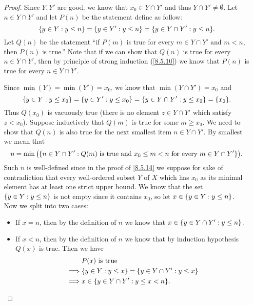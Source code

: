 \begin{proof}
  Since \(Y, Y'\) are good, we know that \(x_0 \in Y \cap Y'\) and thus \(Y \cap Y' \neq \emptyset\).
  Let \(n \in Y \cap Y'\) and let \(P(n)\) be the statement define as follow:
  \[
    \set{y \in Y : y \leq n} = \set{y \in Y' : y \leq n} = \set{y \in Y \cap Y' : y \leq n}.
  \]
  Let \(Q(n)\) be the statement ``if \(P(m)\) is true for every \(m \in Y \cap Y'\) and \(m < n\), then \(P(n)\) is true.''
  Note that if we can show that \(Q(n)\) is true for every \(n \in Y \cap Y'\), then by principle of strong induction (\cref{8.5.10}) we know that \(P(n)\) is true for every \(n \in Y \cap Y'\).

  Since \(\min(Y) = \min(Y') = x_0\), we know that \(\min(Y \cap Y') = x_0\) and
  \[
    \set{y \in Y : y \leq x_0} = \set{y \in Y' : y \leq x_0} = \set{y \in Y \cap Y' : y \leq x_0} = \set{x_0}.
  \]
  Thus \(Q(x_0)\) is vacuously true (there is no element \(z \in Y \cap Y'\) which satisfy \(z < x_0\)).
  Suppose inductively that \(Q(m)\) is true for some \(m \geq x_0\).
  We need to show that \(Q(n)\) is also true for the next smallest item \(n \in Y \cap Y'\).
  By smallest we mean that
  \[
    n = \min\big(\set{n \in Y \cap Y' : Q(m) \text{ is true and } x_0 \leq m < n \text { for every } m \in Y \cap Y'}\big).
  \]
  Such \(n\) is well-defined since in the proof of \cref{8.5.14} we suppose for sake of contradiction that every well-ordered subset \(Y\) of \(X\) which has \(x_0\) as its minimal element has at least one strict upper bound.
  We know that the set \(\left\lbrace y \in Y : y \leq n\right\rbrace\) is not empty since it contains \(x_0\), so let \(x \in \left\lbrace y \in Y : y \leq n\right\rbrace\).
  Now we split into two cases:
  \begin{itemize}
    \item If \(x = n\), then by the definition of \(n\) we know that \(x \in \left\lbrace y \in Y \cap Y' : y \leq n\right\rbrace\).
    \item If \(x < n\), then by the definition of \(n\) we know that by induction hypothesis \(Q(x)\) is true.
          Then we have
          \begin{align*}
                     & P(x) \text{ is true}                                        \\
            \implies & \set{y \in Y : y \leq x} = \set{y \in Y \cap Y' : y \leq x} \\
            \implies & x \in \set{y \in Y \cap Y' : y \leq x < n}.
          \end{align*}
  \end{itemize}

\end{proof}
